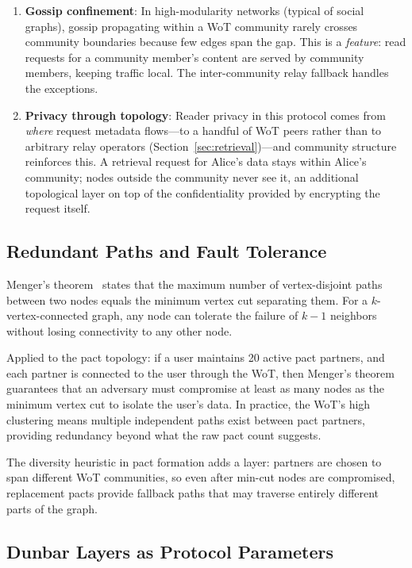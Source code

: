 \documentclass[11pt,a4paper]{article}
\begin{document}
\begin{enumerate}
  \item \textbf{Gossip confinement}: In high-modularity networks (typical of social graphs), gossip propagating within a WoT community rarely crosses community boundaries because few edges span the gap. This is a \emph{feature}: read requests for a community member's content are served by community members, keeping traffic local. The inter-community relay fallback handles the exceptions.
  \item \textbf{Privacy through topology}: Reader privacy in this protocol comes from \emph{where} request metadata flows---to a handful of WoT peers rather than to arbitrary relay operators (Section~\ref{sec:retrieval})---and community structure reinforces this. A retrieval request for Alice's data stays within Alice's community; nodes outside the community never see it, an additional topological layer on top of the confidentiality provided by encrypting the request itself.
\end{enumerate}

\subsection{Redundant Paths and Fault Tolerance}

Menger's theorem~\cite{menger} states that the maximum number of vertex-disjoint paths between two nodes equals the minimum vertex cut separating them. For a $k$-vertex-connected graph, any node can tolerate the failure of $k-1$ neighbors without losing connectivity to any other node.

Applied to the pact topology: if a user maintains 20 active pact partners, and each partner is connected to the user through the WoT, then Menger's theorem guarantees that an adversary must compromise at least as many nodes as the minimum vertex cut to isolate the user's data. In practice, the WoT's high clustering means multiple independent paths exist between pact partners, providing redundancy beyond what the raw pact count suggests.

The diversity heuristic in pact formation adds a layer: partners are chosen to span different WoT communities, so even after min-cut nodes are compromised, replacement pacts provide fallback paths that may traverse entirely different parts of the graph.

\subsection{Dunbar Layers as Protocol Parameters}
\end{document}
